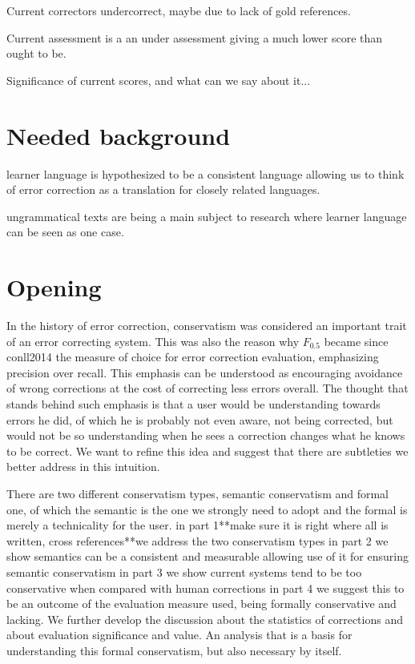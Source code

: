 \documentclass[11pt]{article}
\begin{document}
Current correctors undercorrect, maybe due to lack of gold references.

Current assessment is a an under assessment giving a much lower score
than ought to be.

Significance of current scores, and what can we say about it...

\section{Needed background}

learner language is hypothesized to be a consistent language allowing
us to think of error correction as a translation for closely related
languages.

ungrammatical texts are being a main subject to research where learner
language can be seen as one case.

\section{Opening}

In the history of error correction, conservatism was considered an
important trait of an error correcting system\cite{brockett2006correcting}.
This was also the reason why $F_{0.5}$ became since conll2014\cite{ng2014conll}
the measure of choice for error correction evaluation, emphasizing
precision over recall. This emphasis can be understood as encouraging
avoidance of wrong corrections at the cost of correcting less errors
overall. The thought that stands behind such emphasis is that a user
would be understanding towards errors he did, of which he is probably
not even aware, not being corrected, but would not be so understanding
when he sees a correction changes what he knows to be correct. We want to refine
this idea and suggest that there are subtleties we better address
in this intuition.

There are two different conservatism
types, semantic conservatism and formal one, of which the semantic
is the one we strongly need to adopt and the formal is merely a technicality
for the user. in part 1{*}{*}make sure it is right where all is written,
cross references{*}{*}we address the two conservatism types in part
2 we show semantics can be a consistent and measurable allowing use
of it for ensuring semantic conservatism in part 3 we show current
systems tend to be too conservative when compared with human
corrections in part 4 we suggest this to be an outcome of the evaluation
measure used, being formally conservative and lacking. We further develop
 the discussion about the statistics of corrections 
 and about evaluation significance and value. 
 An analysis that is a basis for understanding this formal conservatism, 
 but also necessary by itself.
\end{document}
